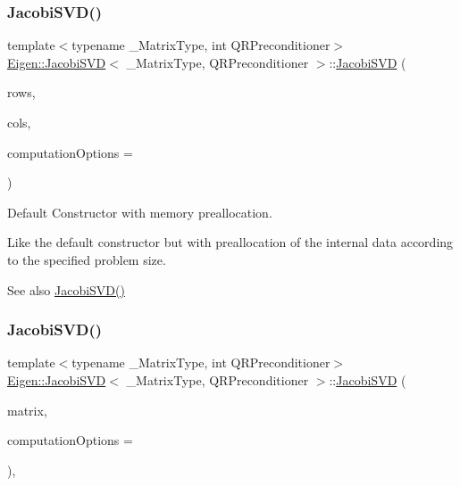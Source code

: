 \subsubsection{\texorpdfstring{JacobiSVD()}{JacobiSVD()}\hspace{0.1cm}{\footnotesize\ttfamily [2/3]}}
{\footnotesize\ttfamily template$<$typename \+\_\+\+Matrix\+Type, int Q\+R\+Preconditioner$>$ \\
\mbox{\hyperlink{class_eigen_1_1_jacobi_s_v_d}{Eigen\+::\+Jacobi\+S\+VD}}$<$ \+\_\+\+Matrix\+Type, Q\+R\+Preconditioner $>$\+::\mbox{\hyperlink{class_eigen_1_1_jacobi_s_v_d}{Jacobi\+S\+VD}} (\begin{DoxyParamCaption}\item[{\mbox{\hyperlink{class_eigen_1_1_s_v_d_base_a6229a37997eca1072b52cca5ee7a2bec}{Index}}}]{rows,  }\item[{\mbox{\hyperlink{class_eigen_1_1_s_v_d_base_a6229a37997eca1072b52cca5ee7a2bec}{Index}}}]{cols,  }\item[{unsigned int}]{computation\+Options = {} }\end{DoxyParamCaption})\hspace{0.3cm}{\ttfamily [inline]}}



Default Constructor with memory preallocation. 

Like the default constructor but with preallocation of the internal data according to the specified problem size. \begin{DoxySeeAlso}{See also}
\mbox{\hyperlink{class_eigen_1_1_jacobi_s_v_d_a55315ab9cd060019a5ad07be798ff3b9}{Jacobi\+S\+V\+D()}} 
\end{DoxySeeAlso}
\mbox{\label{class_eigen_1_1_jacobi_s_v_d_abfd1dd454a6e3edec7feecd97c818a78}} 
\subsubsection{\texorpdfstring{JacobiSVD()}{JacobiSVD()}\hspace{0.1cm}{\footnotesize\ttfamily [3/3]}}
{\footnotesize\ttfamily template$<$typename \+\_\+\+Matrix\+Type, int Q\+R\+Preconditioner$>$ \\
\mbox{\hyperlink{class_eigen_1_1_jacobi_s_v_d}{Eigen\+::\+Jacobi\+S\+VD}}$<$ \+\_\+\+Matrix\+Type, Q\+R\+Preconditioner $>$\+::\mbox{\hyperlink{class_eigen_1_1_jacobi_s_v_d}{Jacobi\+S\+VD}} (\begin{DoxyParamCaption}\item[{const Matrix\+Type \&}]{matrix,  }\item[{unsigned int}]{computation\+Options = {} }\end{DoxyParamCaption})\hspace{0.3cm}{\ttfamily [inline]}, {\ttfamily [explicit]}}



